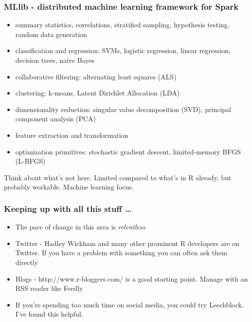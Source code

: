 \documentclass{beamer}
\begin{document}
\begin{frame}
\frametitle{MLlib - distributed machine learning framework for Spark}
\begin{itemize}
\item summary statistics, correlations, stratified sampling, hypothesis testing, random data generation
\item classification and regression: SVMs, logistic regression, linear regression, decision trees, naive Bayes
\item collaborative filtering: alternating least squares (ALS)
\item clustering: k-means, Latent Dirichlet Allocation (LDA)
\item dimensionality reduction: singular value decomposition (SVD), principal component analysis (PCA)
\item feature extraction and transformation
\item optimization primitives: stochastic gradient descent, limited-memory BFGS (L-BFGS)
\end{itemize}
Think about what's not here. Limited compared to what's in R already, but probably workable.
Machine learning focus.
\end{frame}

\begin{frame}
\frametitle{Keeping up with all this stuff \ldots}
\begin{itemize}
\item The pace of change in this area is \emph{relentless}
\item Twitter - Hadley Wickham and many other prominent R developers are on Twitter. If you 
			have a problem with something you can often ask them directly
\item Blogs - http://www.r-bloggers.com/ is a good starting point. Manage with an RSS reader 				like Feedly
\item If you're spending too much time on social media, you could try Leechblock.
			I've found this helpful.
\end{itemize}
\end{frame}
\end{document}
